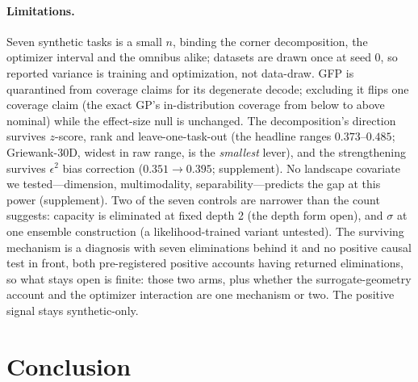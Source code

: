 \documentclass[letterpaper]{article} %
\theoremstyle{plain}
\newcommand{\mdemph}[1]{\emph{#1}}
\begin{document}
\paragraph{Limitations.} Seven synthetic tasks is a small $n$, binding the corner decomposition, the optimizer interval and the omnibus alike; datasets are drawn once at seed 0, so reported variance is training and optimization, not data-draw. GFP is quarantined from coverage claims for its degenerate decode; excluding it flips one coverage claim (the exact GP's in-distribution coverage from below to above nominal) while the effect-size null is unchanged. The decomposition's direction survives $z$-score, rank and leave-one-task-out (the headline ranges $0.373$--$0.485$; Griewank-30D, widest in raw range, is the \mdemph{smallest} lever), and the strengthening survives $\epsilon^2$ bias correction ($0.351\to0.395$; supplement). No landscape covariate we tested---dimension, multimodality, separability---predicts the gap at this power (supplement). Two of the seven controls are narrower than the count suggests: capacity is eliminated at fixed depth 2 (the depth form open), and $\sigma$ at one ensemble construction (a likelihood-trained variant untested). The surviving mechanism is a diagnosis with seven eliminations behind it and no positive causal test in front, both pre-registered positive accounts having returned eliminations, so what stays open is finite: those two arms, plus whether the surrogate-geometry account and the optimizer interaction are one mechanism or two. The positive signal stays synthetic-only.

\section{Conclusion}
\end{document}
